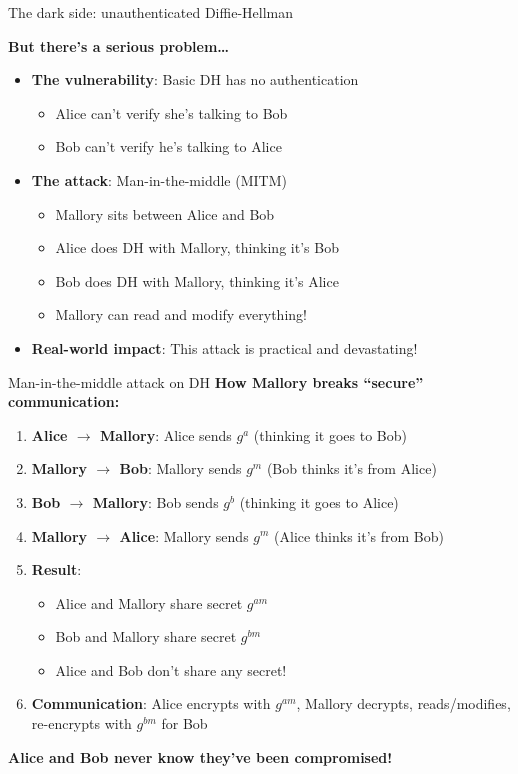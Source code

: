 \documentclass[aspectratio=169, lualatex, handout]{beamer}
\begin{document}
\begin{frame}{The dark side: unauthenticated Diffie-Hellman}
	\begin{center}
		\Large\textbf{But there's a serious problem\ldots}
	\end{center}
	\vspace{0.5cm}
	\begin{itemize}[<+->]
		\item \textbf{The vulnerability}: Basic DH has no authentication
		      \begin{itemize}
			      \item Alice can't verify she's talking to Bob
			      \item Bob can't verify he's talking to Alice
		      \end{itemize}
		\item \textbf{The attack}: Man-in-the-middle (MITM)
		      \begin{itemize}
			      \item Mallory sits between Alice and Bob
			      \item Alice does DH with Mallory, thinking it's Bob
			      \item Bob does DH with Mallory, thinking it's Alice
			      \item Mallory can read and modify everything!
		      \end{itemize}
		\item \textbf{Real-world impact}: This attack is practical and devastating!
	\end{itemize}
\end{frame}

\begin{frame}{Man-in-the-middle attack on DH}
	\textbf{How Mallory breaks ``secure'' communication:}
	\vspace{0.5cm}
	\begin{enumerate}[<+->]
		\item \textbf{Alice $\rightarrow$ Mallory}: Alice sends $g^a$ (thinking it goes to Bob)
		\item \textbf{Mallory $\rightarrow$ Bob}: Mallory sends $g^m$ (Bob thinks it's from Alice)
		\item \textbf{Bob $\rightarrow$ Mallory}: Bob sends $g^b$ (thinking it goes to Alice)
		\item \textbf{Mallory $\rightarrow$ Alice}: Mallory sends $g^m$ (Alice thinks it's from Bob)
		\item \textbf{Result}:
		      \begin{itemize}
			      \item Alice and Mallory share secret $g^{am}$
			      \item Bob and Mallory share secret $g^{bm}$
			      \item Alice and Bob don't share any secret!
		      \end{itemize}
		\item \textbf{Communication}: Alice encrypts with $g^{am}$, Mallory decrypts, reads/modifies, re-encrypts with $g^{bm}$ for Bob
	\end{enumerate}
	\vspace{0.5cm}
	\textbf{Alice and Bob never know they've been compromised!}
\end{frame}
\end{document}

